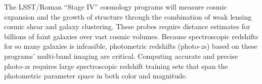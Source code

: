 \documentclass[oneside,11pt]{amsart}
\DeclareRobustCommand{\gtrsim}{%
\mathrel{\hskip-.5em\begin{array}{c}>\\[-8pt]\sim\end{array}\hskip-.5em}}
\begin{document}



The LSST/Roman ``Stage IV'' cosmology programs will measure cosmic expansion and the growth of structure through the combination of weak lensing cosmic shear and galaxy clustering.  These probes require distance estimates for billions of faint galaxies over vast cosmic volumes.  Because spectroscopic redshifts for so many galaxies is infeasible, photometric redshifts (photo-$z$s) based on these programs' multi-band imaging are critical.  Computing accurate and precise photo-$z$s requires large spectroscopic redshift training sets that span the photometric parameter space in both color and magnitude.  
\end{document}
